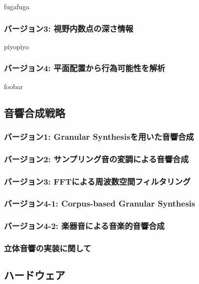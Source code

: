 fugafuga

\subsubsection{バージョン3: 視野内数点の深さ情報}

piyopiyo

\subsubsection{バージョン4: 平面配置から行為可能性を解析}

foobar

\subsection{音響合成戦略}

\subsubsection{バージョン1: Granular Synthesisを用いた音響合成}

\subsubsection{バージョン2: サンプリング音の変調による音響合成}

\subsubsection{バージョン3: FFTによる周波数空間フィルタリング}

\subsubsection{バージョン4-1: Corpus-based Granular Synthesis}

\subsubsection{バージョン4-2: 楽器音による音楽的音響合成}

\subsubsection{立体音響の実装に関して}

\subsection{ハードウェア}


